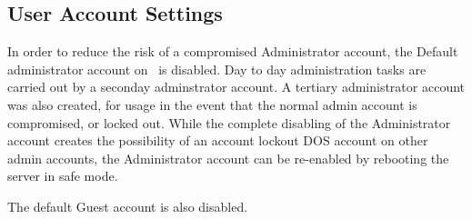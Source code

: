 \subsection{User Account Settings}
In order to reduce the risk of a compromised Administrator account, the Default administrator account on \GameServer\ is disabled.  Day to day administration tasks are carried out by a seconday adminstrator account.  A tertiary administrator account was also created, for usage in the event that the normal admin account is compromised, or locked out.  While the complete disabling of the Administrator account creates the possibility of an account lockout DOS account on other admin accounts, the Administrator account can be re-enabled by rebooting the server in safe mode.

The default Guest account is also disabled.
